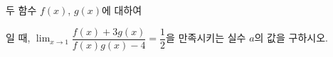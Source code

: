 두 함수 $f(x)$, $g(x)$에 대하여 \par\smallskip{}\par\smallskip\noindent 일 때, $\displaystyle\lim_{x\to 1}\dfrac{f(x)+3g(x)}{f(x)g(x)-4}=\dfrac{1}{2}$을 만족시키는 실수 $a$의 값을 구하시오.
